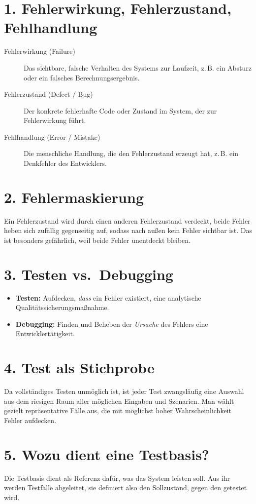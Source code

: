\documentclass[
	fontsize=12pt,          %
	paper=a4,               %
	numbers=noenddot,       %
	listof=totoc,           %
	listof=entryprefix,     %
	listof=nochaptergap,    %
	bibliography=totoc,     %
	parskip=half,           %
	openany                 %
]{scrbook}
\begin{document}
\section*{1. Fehlerwirkung, Fehlerzustand, Fehlhandlung}
\begin{description}
	\item[Fehlerwirkung (Failure)] Das sichtbare, falsche Verhalten des Systems zur
	Laufzeit, z.\,B. ein Absturz oder ein falsches Berechnungsergebnis.
	\item[Fehlerzustand (Defect / Bug)] Der konkrete fehlerhafte Code oder Zustand im
	System, der zur Fehlerwirkung führt.
	\item[Fehlhandlung (Error / Mistake)] Die menschliche Handlung, die den Fehlerzustand
	erzeugt hat, z.\,B. ein Denkfehler des Entwicklers.
\end{description}


\section*{2. Fehlermaskierung}
Ein Fehlerzustand wird durch einen anderen Fehlerzustand verdeckt, beide Fehler heben sich zufällig gegenseitig auf, sodass nach außen kein Fehler sichtbar ist.
Das ist besonders gefährlich, weil beide Fehler unentdeckt bleiben.


\section*{3. Testen vs.\ Debugging}
\begin{itemize}
	\item \textbf{Testen:} Aufdecken, \emph{dass} ein Fehler existiert, eine analytische Qualitätssicherungsmaßnahme.
	\item \textbf{Debugging:} Finden und Beheben der \emph{Ursache} des Fehlers eine Entwicklertätigkeit.
\end{itemize}


\section*{4. Test als Stichprobe}
Da vollständiges Testen unmöglich ist, ist jeder Test zwangsläufig eine Auswahl aus dem riesigen Raum aller möglichen Eingaben und Szenarien.
Man wählt gezielt repräsentative Fälle aus, die mit möglichst hoher Wahrscheinlichkeit Fehler aufdecken.


\section*{5. Wozu dient eine Testbasis?}
Die Testbasis dient als Referenz dafür, was das System leisten soll.
Aus ihr werden Testfälle abgeleitet, sie definiert also den Sollzustand, gegen den getestet wird.
\end{document}
